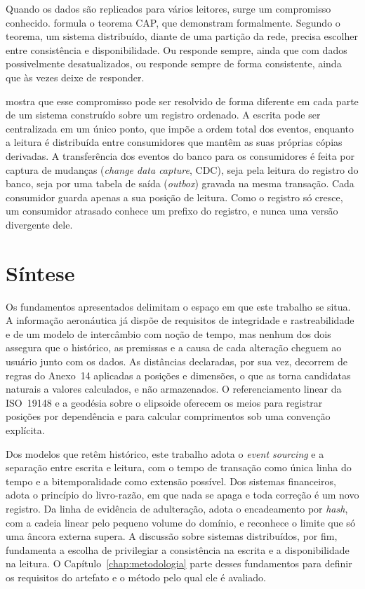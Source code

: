 Quando os dados são replicados para vários leitores, surge um compromisso conhecido.  formula o teorema CAP, que  demonstram formalmente. Segundo o teorema, um sistema distribuído, diante de uma partição da rede, precisa escolher entre consistência e disponibilidade. Ou responde sempre, ainda que com dados possivelmente desatualizados, ou responde sempre de forma consistente, ainda que às vezes deixe de responder.

 mostra que esse compromisso pode ser resolvido de forma diferente em cada parte de um sistema construído sobre um registro ordenado. A escrita pode ser centralizada em um único ponto, que impõe a ordem total dos eventos, enquanto a leitura é distribuída entre consumidores que mantêm as suas próprias cópias derivadas. A transferência dos eventos do banco para os consumidores é feita por captura de mudanças (\textit{change data capture}, CDC), seja pela leitura do registro do banco, seja por uma tabela de saída (\textit{outbox}) gravada na mesma transação. Cada consumidor guarda apenas a sua posição de leitura. Como o registro só cresce, um consumidor atrasado conhece um prefixo do registro, e nunca uma versão divergente dele.

\section{Síntese}\label{sec:sintese-fund}

Os fundamentos apresentados delimitam o espaço em que este trabalho se situa. A informação aeronáutica já dispõe de requisitos de integridade e rastreabilidade e de um modelo de intercâmbio com noção de tempo, mas nenhum dos dois assegura que o histórico, as premissas e a causa de cada alteração cheguem ao usuário junto com os dados. As distâncias declaradas, por sua vez, decorrem de regras do Anexo~14 aplicadas a posições e dimensões, o que as torna candidatas naturais a valores calculados, e não armazenados. O referenciamento linear da ISO~19148 e a geodésia sobre o elipsoide oferecem os meios para registrar posições por dependência e para calcular comprimentos sob uma convenção explícita.

Dos modelos que retêm histórico, este trabalho adota o \textit{event sourcing} e a separação entre escrita e leitura, com o tempo de transação como única linha do tempo e a bitemporalidade como extensão possível. Dos sistemas financeiros, adota o princípio do livro-razão, em que nada se apaga e toda correção é um novo registro. Da linha de evidência de adulteração, adota o encadeamento por \textit{hash}, com a cadeia linear pelo pequeno volume do domínio, e reconhece o limite que só uma âncora externa supera. A discussão sobre sistemas distribuídos, por fim, fundamenta a escolha de privilegiar a consistência na escrita e a disponibilidade na leitura. O Capítulo~\ref{chap:metodologia} parte desses fundamentos para definir os requisitos do artefato e o método pelo qual ele é avaliado.
